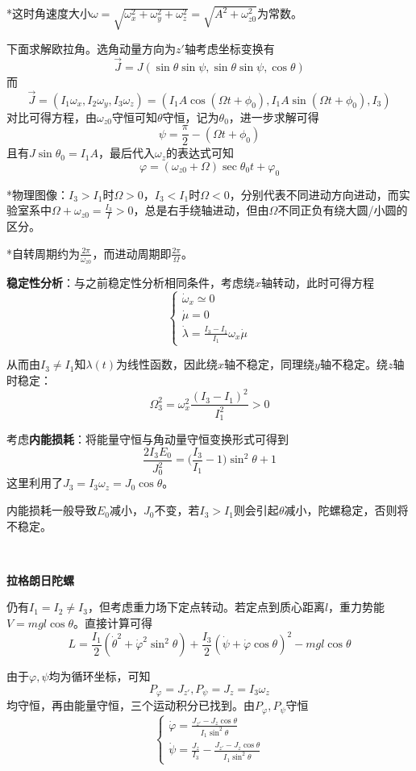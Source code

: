 \documentclass[a4paper,UTF8,fontset=windows]{ctexart}
\begin{document}
*这时角速度大小$\omega=\sqrt{\omega_x^2+\omega_y^2+\omega_z^2}=\sqrt{A^2+\omega_{z0}^2}$为常数。

下面求解欧拉角。选角动量方向为$z'$轴考虑坐标变换有
$$\vec{J}=J(\sin\theta\sin\psi,\sin\theta\sin\psi,\cos\theta)$$
而
$$\vec{J}=(I_1\omega_x,I_2\omega_y,I_3\omega_z)=(I_1A\cos(\Omega t+\phi_0),I_1A\sin(\Omega t+\phi_0),I_3)$$
对比可得方程，由$\omega_{z0}$守恒可知$\theta$守恒，记为$\theta_0$，进一步求解可得
$$\psi=\frac{\pi}{2}-(\Omega t+\phi_0)$$
且有$J\sin\theta_0=I_1A$，最后代入$\omega_z$的表达式可知
$$\varphi=(\omega_{z0}+\Omega)\sec\theta_0t+\varphi_0$$

*物理图像：$I_3>I_1$时$\Omega>0$，$I_3<I_1$时$\Omega<0$，分别代表不同进动方向进动，而实验室系中$\Omega+\omega_{z0}=\frac{I_3}{I}>0$，总是右手绕轴进动，但由$\Omega$不同正负有绕大圆/小圆的区分。

*自转周期约为$\frac{2\pi}{\omega_{z0}}$，而进动周期即$\frac{2\pi}{\Omega}$。

\textbf{稳定性分析}：与之前稳定性分析相同条件，考虑绕$x$轴转动，此时可得方程
$$\begin{cases}\dot{\omega}_x\simeq0\\\dot{\mu}=0\\\dot{\lambda}=\frac{I_3-I_1}{I_1}\omega_x\dot{\mu}\end{cases}$$

从而由$I_3\ne I_1$知$\lambda(t)$为线性函数，因此绕$x$轴不稳定，同理绕$y$轴不稳定。绕$z$轴时稳定：
$$\Omega_3^2=\omega_x^2\frac{(I_3-I_1)^2}{I_1^2}>0$$

考虑\textbf{内能损耗}：将能量守恒与角动量守恒变换形式可得到
$$\frac{2I_3E_0}{J_0^2}=\bigg(\frac{I_3}{I_1}-1\bigg)\sin^2\theta+1$$
这里利用了$J_3=I_3\omega_z=J_0\cos\theta$。

内能损耗一般导致$E_0$减小，$J_0$不变，若$I_3>I_1$则会引起$\theta$减小，陀螺稳定，否则将不稳定。

\

\textbf{拉格朗日陀螺}

仍有$I_1=I_2\ne I_3$，但考虑重力场下定点转动。若定点到质心距离$l$，重力势能$V=mgl\cos\theta$。直接计算可得
$$L=\frac{I_1}{2}(\dot{\theta}^2+\dot{\varphi}^2\sin^2\theta)+\frac{I_3}{2}(\dot{\psi}+\dot{\varphi}\cos\theta)^2-mgl\cos\theta$$

由于$\varphi,\psi$均为循环坐标，可知
$$P_\varphi=J_{z'},P_\psi=J_z=I_3\omega_z$$
均守恒，再由能量守恒，三个运动积分已找到。由$P_\varphi,P_\psi$守恒
$$\begin{cases}\dot{\varphi}=\frac{J_{z'}-J_z\cos\theta}{I_1\sin^2\theta}\\\dot{\psi}=\frac{J_z}{I_3}-\frac{J_{z'}-J_z\cos\theta}{I_1\sin^2\theta}\end{cases}$$
\end{document}
